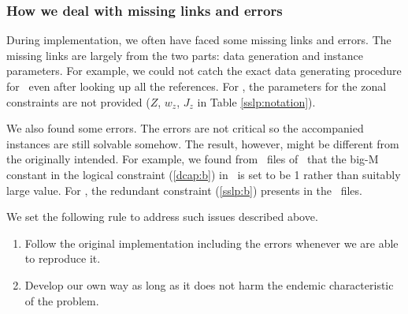 \subsubsection{How we deal with missing links and errors}
During implementation, we often have faced some missing links and errors. The missing links are largely from the two parts: data generation and instance parameters. For example, we could not catch the exact data generating procedure for \mptsps\ even after looking up all the references. For \sslp, the parameters for the zonal constraints are not provided ($Z$, $w_z$, $J_z$ in Table \ref{sslp:notation}). 

We also found some errors. The errors are not critical so the accompanied instances are still solvable somehow. The result, however, might be different from the originally intended. For example, we found from \smps\ files of \dcap\ that the big-M constant in the logical constraint (\ref{dcap:b}) in \dcap\ is set to be 1 rather than suitably large value. For \sslp, the redundant constraint (\ref{sslp:b}) presents in the \smps\ files. 

We set the following rule to address such issues described above.
\begin{enumerate}
	\item Follow the original implementation including the errors whenever we are able to reproduce it.
	\item Develop our own way as long as it does not harm the endemic characteristic of the problem.
\end{enumerate}

